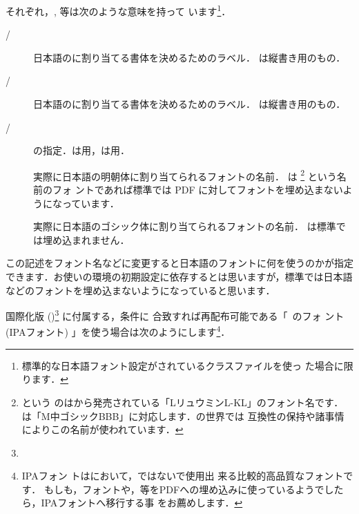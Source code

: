 それぞれ，, 等は次のような意味を持って
います\footnote{標準的な日本語フォント設定がされているクラスファイルを使っ
た場合に限ります．}．

\begin{description}
 \item[/] 
  日本語のに割り当てる書体を決めるためのラベル．
  は縦書き用のもの．
 \item[/] 
  日本語のに割り当てる書体を決めるためのラベル．
  は縦書き用のもの．
 \item[/] 
  の指定．は用，は用．
 \item[] 
  実際に日本語の明朝体に割り当てられるフォントの名前．
  \Dvipdfmx は \footnote{という
  のはから発売されている「LリュウミンL-KL」のフォント名です．
  は「M中ゴシックBBB」に対応します．\pTeX の世界では
  互換性の保持や諸事情によりこの名前が使われています．} という名前のフォ
  ントであれば標準では PDF に対してフォントを埋め込まないようになっています．
 \item[] 
  実際に日本語のゴシック体に割り当てられるフォントの名前．
  は標準では埋め込まれません．
\end{description}

この記述をフォント名などに変更すると日本語のフォントに何を使うのかが指定
できます．お使いの環境の初期設定に依存するとは思いますが，標準では日本語
などのフォントを埋め込まないようになっていると思います．


%
国際化版 ()\footnote{\webGRASSIPA} に付属する，条件に
合致すれば再配布可能である「~のフォ
ント ({IPAフォント}) 」を使う場合は次のようにします\footnote{IPAフォン
トは\genzai において，ではない\unixos で使用出
来る比較的高品質なフォントです．
%
%
%
%
もしも，フォントや，等をPDFへの埋め込みに使っているようでしたら，IPAフォントへ移行する事
をお薦めします．}．

